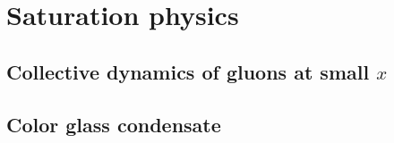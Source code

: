 \chapter{Saturation physics}
\label{chp:saturation}

\section{Collective dynamics of gluons at small $x$}\label{sec:smallx}

\section{Color glass condensate}\label{sec:CGC}

